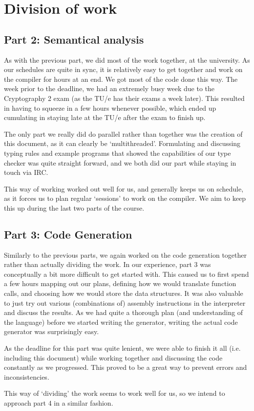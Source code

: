 \documentclass[a4paper]{article}
\begin{document}
\newpage
\section{Division of work}

\subsection{Part 2: Semantical analysis}
As with the previous part, we did most of the work together, at the university. As our schedules are quite in sync, it is relatively easy to get together and work on the compiler for hours at an end. We got most of the code done this way. The week prior to the deadline, we had an extremely busy week due to the Cryptography 2 exam (as the TU/e has their exams a week later). This resulted in having to squeeze in a few hours whenever possible, which ended up cumulating in staying late at the TU/e after the exam to finish up.

The only part we really did do parallel rather than together was the creation of this document, as it can clearly be `multithreaded'. Formulating and discussing typing rules and example programs that showed the capabilities of our type checker was quite straight forward, and we both did our part while staying in touch via IRC.

This way of working worked out well for us, and generally keeps us on schedule, as it forces us to plan regular `sessions' to work on the compiler. We aim to keep this up during the last two parts of the course.

\subsection{Part 3: Code Generation}

Similarly to the previous parts, we again worked on the code generation together rather than actually dividing the work. In our experience, part 3 was conceptually a bit more difficult to get started with. This caused us to first spend a few hours mapping out our plans, defining how we would translate function calls, and choosing how we would store the data structures. It was also valuable to just try out various (combinations of) assembly instructions in the interpreter and discuss the results. As we had quite a thorough plan (and understanding of the language) before we started writing the generator, writing the actual code generator was surprisingly easy.

As the deadline for this part was quite lenient, we were able to finish it all (i.e. including this document) while working together and discussing the code constantly as we progressed. This proved to be a great way to prevent errors and inconsistencies.

This way of `dividing' the work seems to work well for us, so we intend to approach part 4 in a similar fashion.
\end{document}
